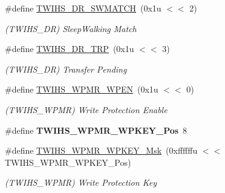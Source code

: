 \begin{DoxyCompactItemize}
\#define \mbox{\hyperlink{group__SAMV71__TWIHS_gaa7e8e2c77a06988dfcdcbaab9f84df47}{T\+W\+I\+H\+S\+\_\+\+D\+R\+\_\+\+S\+W\+M\+A\+T\+CH}}~(0x1u $<$$<$ 2)
\begin{DoxyCompactList}\small\item\em (T\+W\+I\+H\+S\+\_\+\+DR) Sleep\+Walking Match \end{DoxyCompactList}\item 
\mbox{\label{group__SAMV71__TWIHS_ga2fbb5395caacf7fd60e20a2aff2bd1c3}} 
\#define \mbox{\hyperlink{group__SAMV71__TWIHS_ga2fbb5395caacf7fd60e20a2aff2bd1c3}{T\+W\+I\+H\+S\+\_\+\+D\+R\+\_\+\+T\+RP}}~(0x1u $<$$<$ 3)
\begin{DoxyCompactList}\small\item\em (T\+W\+I\+H\+S\+\_\+\+DR) Transfer Pending \end{DoxyCompactList}\item 
\mbox{\label{group__SAMV71__TWIHS_ga0f5bbcefe4e29b43633d06b7a4d08c45}} 
\#define \mbox{\hyperlink{group__SAMV71__TWIHS_ga0f5bbcefe4e29b43633d06b7a4d08c45}{T\+W\+I\+H\+S\+\_\+\+W\+P\+M\+R\+\_\+\+W\+P\+EN}}~(0x1u $<$$<$ 0)
\begin{DoxyCompactList}\small\item\em (T\+W\+I\+H\+S\+\_\+\+W\+P\+MR) Write Protection Enable \end{DoxyCompactList}\item 
\mbox{\label{group__SAMV71__TWIHS_ga8d7157d7e310207cbaad1dc4f2773c6d}} 
\#define {\bfseries T\+W\+I\+H\+S\+\_\+\+W\+P\+M\+R\+\_\+\+W\+P\+K\+E\+Y\+\_\+\+Pos}~8
\item 
\mbox{\label{group__SAMV71__TWIHS_gad433cad3185d19b00f7c05e49cbd7e13}} 
\#define \mbox{\hyperlink{group__SAMV71__TWIHS_gad433cad3185d19b00f7c05e49cbd7e13}{T\+W\+I\+H\+S\+\_\+\+W\+P\+M\+R\+\_\+\+W\+P\+K\+E\+Y\+\_\+\+Msk}}~(0xffffffu $<$$<$ T\+W\+I\+H\+S\+\_\+\+W\+P\+M\+R\+\_\+\+W\+P\+K\+E\+Y\+\_\+\+Pos)
\begin{DoxyCompactList}\small\item\em (T\+W\+I\+H\+S\+\_\+\+W\+P\+MR) Write Protection Key \end{DoxyCompactList}\item 
\mbox{\label{group__SAMV71__TWIHS_gad1eb34788ba32551c14ab91fc551eef3}} 

\end{DoxyCompactItemize}
